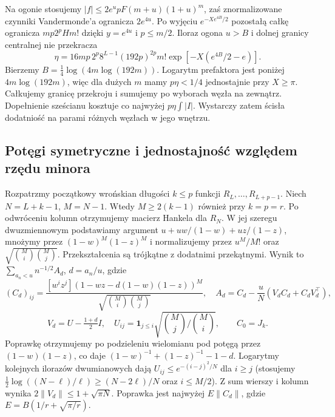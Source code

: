 \documentclass[11pt,a4paper,reqno]{amsart}
\numberwithin{equation}{section}
\begin{document}
Na ogonie stosujemy \(|f|\le2e^u pF(m+u)(1+u)^m\), zaś znormalizowane czynniki Vandermonde'a ogranicza \(2e^{4u}\). Po wyjęciu \(e^{-Xe^{4B}/2}\) pozostałą całkę ogranicza \(mp2^pH m!\) dzięki \(y=e^{4u}\) i \(p\le m/2\). Iloraz ogona \(u>B\) i dolnej granicy centralnej nie przekracza \[\eta=16mp\,2^p8^{L-1}(192p)^{2p}m!\exp[-X(e^{4B}/2-e)].\] Bierzemy \(B=\frac14\log(4m\log(192m))\). Logarytm prefaktora jest poniżej \(4m\log(192m)\), więc dla dużych \(m\) mamy \(p\eta<1/4\) jednostajnie przy \(X\ge\pi\). Całkujemy granicę przekroju i sumujemy po wyborach węzła na zewnątrz. Dopełnienie sześcianu kosztuje co najwyżej \(p\eta\int |I|\). Wystarczy zatem ścisła dodatniość na parami różnych węzłach w jego wnętrzu.

\subsection{Potęgi symetryczne i jednostajność względem rzędu minora}\label{sec:shift}


Rozpatrzmy początkowy wrońskian długości \(k\le p\) funkcji \(R_L,\ldots,R_{L+p-1}\). Niech \(N=L+k-1\), \(M=N-1\). Wtedy \(M\ge2(k-1)\) również przy \(k=p=r\). Po odwróceniu kolumn otrzymujemy macierz Hankela dla \(R_N\). W jej szeregu dwuzmiennowym podstawiamy argument \(u+uw/(1-w)+uz/(1-z)\), mnożymy przez \((1-w)^M(1-z)^M\) i normalizujemy przez \(u^M/M!\) oraz \(\sqrt{\binom Mi\binom Mj}\). Przekształcenia są trójkątne z dodatnimi przekątnymi. Wynik to \(\sum_{a_n<u}n^{-1/2}A_d\), \(d=a_n/u\), gdzie \[ (C_d)_{ij}=\frac{[w^iz^j](1-wz-d(1-w)(1-z))^M}{\sqrt{\binom Mi\binom Mj}},\quad
 A_d=C_d-\frac{u}{N}(V_d C_d+C_dV_d^\top),\] \[V_d=U-\tfrac{1+d}{2}I,\quad U_{ij}=\mathbf1_{j\le i}\sqrt{\binom Mj/\binom Mi},\qquad C_0=J_k.\] Poprawkę otrzymujemy po podzieleniu wielomianu pod potęgą przez \((1-w)(1-z)\), co daje \((1-w)^{-1}+(1-z)^{-1}-1-d\). Logarytmy kolejnych ilorazów dwumianowych dają \(U_{ij}\le e^{-(i-j)^2/N}\) dla \(i\ge j\) (stosujemy \(\frac12\log((N-\ell)/\ell)\ge(N-2\ell)/N\) oraz \(i\le M/2\)). Z sum wierszy i kolumn wynika \(2\|V_d\|\le1+\sqrt{\pi N}\). Poprawka jest najwyżej \(E\|C_d\|\), gdzie \(E=B(1/r+\sqrt{\pi/r})\).
\end{document}

